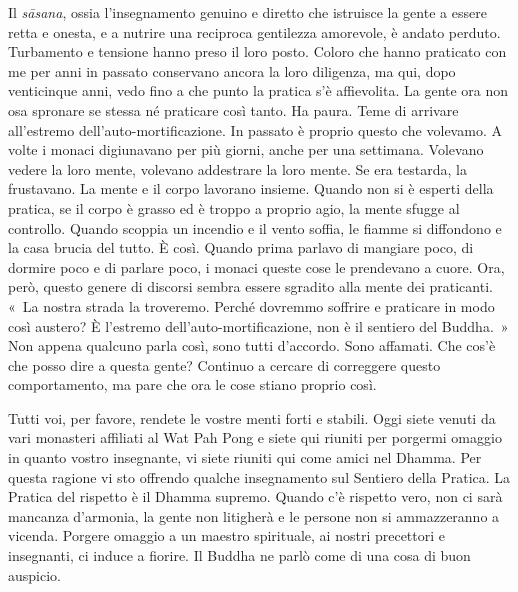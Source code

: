 Il \emph{sāsana}, ossia l'insegnamento genuino e diretto che istruisce
la gente a essere retta e onesta, e a nutrire una reciproca gentilezza
amorevole, è andato perduto. Turbamento e tensione hanno preso il loro
posto. Coloro che hanno praticato con me per anni in passato conservano
ancora la loro diligenza, ma qui, dopo venticinque anni, vedo fino a che
punto la pratica s'è affievolita. La gente ora non osa spronare se
stessa né praticare così tanto. Ha paura. Teme di arrivare all'estremo
dell'auto-mortificazione. In passato è proprio questo che volevamo. A
volte i monaci digiunavano per più giorni, anche per una settimana.
Volevano vedere la loro mente, volevano addestrare la loro mente. Se era
testarda, la frustavano. La mente e il corpo lavorano insieme. Quando
non si è esperti della pratica, se il corpo è grasso ed è troppo a
proprio agio, la mente sfugge al controllo. Quando scoppia un incendio e
il vento soffia, le fiamme si diffondono e la casa brucia del tutto. È
così. Quando prima parlavo di mangiare poco, di dormire poco e di
parlare poco, i monaci queste cose le prendevano a cuore. Ora, però,
questo genere di discorsi sembra essere sgradito alla mente dei
praticanti. «~La nostra strada la troveremo. Perché dovremmo soffrire e
praticare in modo così austero? È l'estremo dell'auto-mortificazione,
non è il sentiero del Buddha.~» Non appena qualcuno parla così, sono
tutti d'accordo. Sono affamati. Che cos'è che posso dire a questa gente?
Continuo a cercare di correggere questo comportamento, ma pare che ora
le cose stiano proprio così.

Tutti voi, per favore, rendete le vostre menti forti e stabili. Oggi
siete venuti da vari monasteri affiliati al Wat Pah Pong e siete qui
riuniti per porgermi omaggio in quanto vostro insegnante, vi siete
riuniti qui come amici nel Dhamma. Per questa ragione vi sto offrendo
qualche insegnamento sul Sentiero della Pratica. La Pratica del rispetto
è il Dhamma supremo. Quando c'è rispetto vero, non ci sarà mancanza
d'armonia, la gente non litigherà e le persone non si ammazzeranno a
vicenda. Porgere omaggio a un maestro spirituale, ai nostri precettori e
insegnanti, ci induce a fiorire. Il Buddha ne parlò come di una cosa di
buon auspicio.

